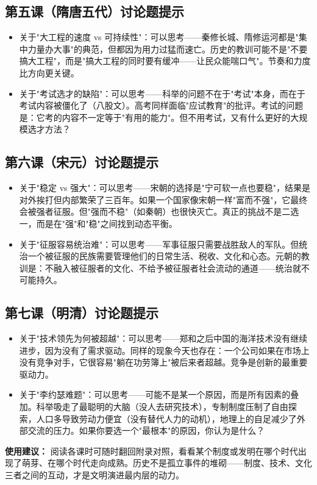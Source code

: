 \documentclass[a4paper,12pt]{ctexart}
\begin{document}
\subsection*{第五课（隋唐五代）讨论题提示}
\begin{itemize}
  \item 关于"大工程的速度 vs 可持续性"：可以思考——秦修长城、隋修运河都是"集中力量办大事"的典范，但都因为用力过猛而速亡。历史的教训可能不是"不要搞大工程"，而是"搞大工程的同时要有缓冲——让民众能喘口气"。节奏和力度比方向更关键。
  \item 关于"考试选才的缺陷"：可以思考——科举的问题不在于"考试"本身，而在于考试内容被僵化了（八股文）。高考同样面临"应试教育"的批评。考试的问题是：它考的内容不一定等于"有用的能力"。但不用考试，又有什么更好的大规模选才方法？
\end{itemize}

\subsection*{第六课（宋元）讨论题提示}
\begin{itemize}
  \item 关于"稳定 vs 强大"：可以思考——宋朝的选择是"宁可软一点也要稳"，结果是对外挨打但内部繁荣了三百年。如果一个国家像宋朝一样"富而不强"，它最终会被强者征服。但"强而不稳"（如秦朝）也很快灭亡。真正的挑战不是二选一，而是在"强"和"稳"之间找到动态平衡。
  \item 关于"征服容易统治难"：可以思考——军事征服只需要战胜敌人的军队。但统治一个被征服的民族需要管理他们的日常生活、税收、文化和心态。元朝的教训是：不融入被征服者的文化、不给予被征服者社会流动的通道——统治就不可能持久。
\end{itemize}

\subsection*{第七课（明清）讨论题提示}
\begin{itemize}
  \item 关于"技术领先为何被超越"：可以思考——郑和之后中国的海洋技术没有继续进步，因为没有了需求驱动。同样的现象今天也存在：一个公司如果在市场上没有竞争对手，它很容易"躺在功劳簿上"被后来者超越。竞争是创新的最重要驱动力。
  \item 关于"李约瑟难题"：可以思考——可能不是某一个原因，而是所有因素的叠加。科举吸走了最聪明的大脑（没人去研究技术），专制制度压制了自由探索，人口多导致劳动力便宜（没有替代人力的动机），地理上的自足减少了外部交流的压力。如果你要选一个"最根本"的原因，你认为是什么？
\end{itemize}

\vspace{0.3cm}
\textcolor{blue!70!black}{\textbf{使用建议：}} 阅读各课时可随时翻回附录对照，看看某个制度或发明在哪个时代出现了萌芽、在哪个时代走向成熟。历史不是孤立事件的堆砌——制度、技术、文化三者之间的互动，才是文明演进最内层的动力。
\end{document}
